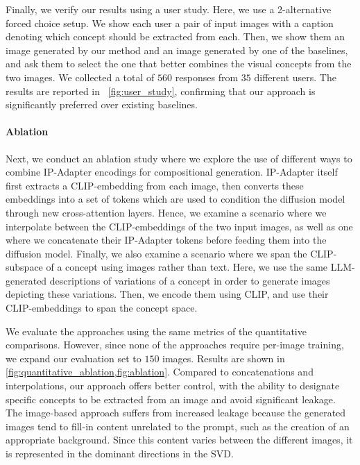 Finally, we verify our results using a user study. Here, we use a 2-alternative forced choice setup. We show each user a pair of input images with a caption denoting which concept should be extracted from each. Then, we show them an image generated by our method and an image generated by one of the baselines, and ask them to select the one that better combines the visual concepts from the two images. We collected a total of $560$ responses from $35$ different users. The results are reported in ~\cref{fig:user_study}, confirming that our approach is significantly preferred over existing baselines.




\paragraph{\textbf{Ablation}}
Next, we conduct an ablation study where we explore the use of different ways to combine IP-Adapter encodings for compositional generation. IP-Adapter itself first extracts a CLIP-embedding from each image, then converts these embeddings into a set of tokens which are used to condition the diffusion model through new cross-attention layers. Hence, we examine a scenario where we interpolate between the CLIP-embeddings of the two input images, as well as one where we concatenate their IP-Adapter tokens before feeding them into the diffusion model. Finally, we also examine a scenario where we span the CLIP-subspace of a concept using images rather than text. Here, we use the same LLM-generated descriptions of variations of a concept in order to generate images depicting these variations. Then, we encode them using CLIP, and use their CLIP-embeddings to span the concept space.

We evaluate the approaches using the same metrics of the quantitative comparisons. However, since none of the approaches require per-image training, we expand our evaluation set to $150$ images. Results are shown in \cref{fig:quantitative_ablation,fig:ablation}. Compared to concatenations and interpolations, our approach offers better control, with the ability to designate specific concepts to be extracted from an image and avoid significant leakage. The image-based approach suffers from increased leakage because the generated images tend to fill-in content unrelated to the prompt, such as the creation of an appropriate background. Since this content varies between the different images, it is represented in the dominant directions in the SVD.

